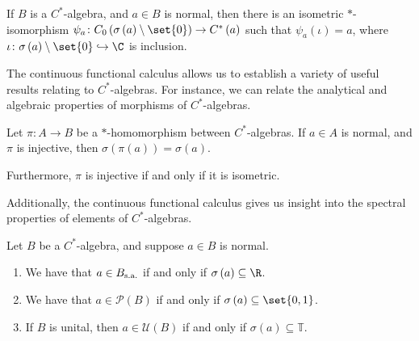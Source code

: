 \begin{corollary}
  If $B$ is a $C^{\ast}$-algebra, and $a\in B$ is normal, then there is an isometric $\ast$-isomorphism $\psi_a\colon C_0\left( \sigma\left( a \right)\setminus \set{0} \right)\rightarrow C^{\ast}\left( a \right)$ such that $\psi_a\left( \iota \right) = a$, where $\iota\colon \sigma\left( a \right)\setminus \set{0} \hookrightarrow \C$ is inclusion.
\end{corollary}
The continuous functional calculus allows us to establish a variety of useful results relating to $C^{\ast}$-algebras. For instance, we can relate the analytical and algebraic properties of morphisms of $C^{\ast}$-algebras.
\begin{proposition}
  Let $\pi\colon A\rightarrow B$ be a $\ast$-homomorphism between $C^{\ast}$-algebras. If $a\in A$ is normal, and $\pi$ is injective, then $\sigma\left( \pi\left( a \right) \right) = \sigma\left( a \right)$.\newline

  Furthermore, $\pi$ is injective if and only if it is isometric.
\end{proposition}
Additionally, the continuous functional calculus gives us insight into the spectral properties of elements of $C^{\ast}$-algebras.
\begin{proposition}\label{prop:spectra_cstar_algebras}
  Let $B$ be a $C^{\ast}$-algebra, and suppose $a\in B$ is normal.
  \begin{enumerate}[(1)]
    \item We have that $a\in B_{\operatorname{s.a.}}$ if and only if $\sigma\left( a \right)\subseteq \R$.
    \item We have that $a\in \mathcal{P}\left( B \right)$ if and only if $\sigma\left( a \right)\subseteq \set{0,1}$.
    \item If $B$ is unital, then $a\in \mathcal{U}\left( B \right)$ if and only if $\sigma\left( a \right)\subseteq \mathbb{T}$.
  \end{enumerate}
\end{proposition}

